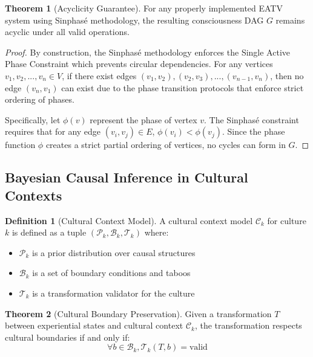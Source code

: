\documentclass[11pt]{article}
\theoremstyle{definition}
\newtheorem{definition}{Definition}
\newtheorem{theorem}{Theorem}
\begin{document}
\begin{theorem}[Acyclicity Guarantee]
For any properly implemented EATV system using Sinphasé methodology, the resulting consciousness DAG $G$ remains acyclic under all valid operations.
\end{theorem}

\begin{proof}
By construction, the Sinphasé methodology enforces the Single Active Phase Constraint which prevents circular dependencies. For any vertices $v_1, v_2, ..., v_n \in V$, if there exist edges $(v_1, v_2), (v_2, v_3), ..., (v_{n-1}, v_n)$, then no edge $(v_n, v_1)$ can exist due to the phase transition protocols that enforce strict ordering of phases.

Specifically, let $\phi(v)$ represent the phase of vertex $v$. The Sinphasé constraint requires that for any edge $(v_i, v_j) \in E$, $\phi(v_i) < \phi(v_j)$. Since the phase function $\phi$ creates a strict partial ordering of vertices, no cycles can form in $G$.
\end{proof}

\subsection{Bayesian Causal Inference in Cultural Contexts}

\begin{definition}[Cultural Context Model]
A cultural context model $\mathcal{C}_k$ for culture $k$ is defined as a tuple $(\mathcal{P}_k, \mathcal{B}_k, \mathcal{T}_k)$ where:
\begin{itemize}
    \item $\mathcal{P}_k$ is a prior distribution over causal structures
    \item $\mathcal{B}_k$ is a set of boundary conditions and taboos
    \item $\mathcal{T}_k$ is a transformation validator for the culture
\end{itemize}
\end{definition}

\begin{theorem}[Cultural Boundary Preservation]
Given a transformation $T$ between experiential states and cultural context $\mathcal{C}_k$, the transformation respects cultural boundaries if and only if:
\begin{equation}
\forall b \in \mathcal{B}_k, \mathcal{T}_k(T, b) = \text{valid}
\end{equation}
\end{theorem}
\end{document}

